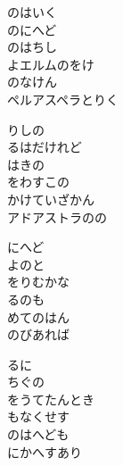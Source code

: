 \documentclass[10pt,b5j]{tarticle} %
\begin{document}
\vspace{1.5em} %
\newcommand{\linespace}{0.5em} %
\newcommand{\blocksize}{0.5\hsize} %
\begin{enumerate} %
    \begin{minipage}[c]{\blocksize}
    
        \vspace{\linespace}
        \item
        のはいく\\
        のにへど\\
        のはちし\\
        よエルムのをけ\\
        のなけん\\
        ペルアスペラとりく
        
        \vspace{\linespace}
        \item
        りしの\\
        るはだけれど\\
        はきの\\
        をわすこの\\
        かけていざかん\\
        アドアストラのの
        
        \vspace{\linespace}
        \item
        にへど\\
        よのと\\
        をりむかな\\
        るのも\\
        めてのはん\\
        のびあれば
        
        \vspace{\linespace}
        \item
        るに\\
        ちぐの\\
        をうてたんとき\\
        もなくせす\\
        のはへども\\
        にかへすあり
        

\end{minipage}
\end{enumerate}
\end{document}

